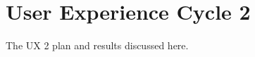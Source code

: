 \chapter{User Experience Cycle 2}
\label{ch:ux2-cycle_report}

The UX 2 plan and results discussed here.